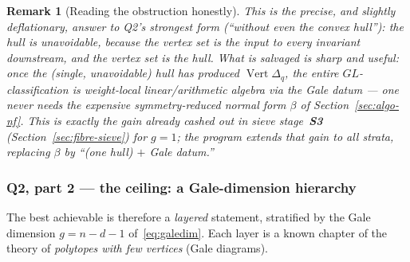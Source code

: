 \documentclass{amsart}
\newtheorem{remark}[theorem]{Remark}
\begin{document}
\begin{remark}[Reading the obstruction honestly]\label{rmk:obstruction}
This is the precise, and slightly deflationary, answer to Q2's strongest form
(``without even the convex hull''): \emph{the hull is unavoidable, because the
vertex set is the input to every invariant downstream, and the vertex set is the
hull.} What \emph{is} salvaged is sharp and useful: once the (single, unavoidable)
hull has produced $\operatorname{Vert}\Delta_q$, the entire $GL$-classification
is weight-local linear/arithmetic algebra via the Gale datum --- one never needs
the expensive symmetry-reduced normal form $\beta$ of Section~\ref{sec:algo-nf}.
This is exactly the gain already cashed out in sieve stage~\textbf{S3}
(Section~\ref{sec:fibre-sieve}) for $g=1$; the program extends that gain to all
strata, replacing $\beta$ by ``(one hull) $+$ Gale datum.''
\end{remark}

\subsubsection*{Q2, part 2 --- the ceiling: a Gale-dimension hierarchy}

The best achievable is therefore a \emph{layered} statement, stratified by the
Gale dimension $g=n-d-1$ of~\eqref{eq:galedim}. Each layer is a known chapter of
the theory of \emph{polytopes with few vertices} (Gale diagrams).
\end{document}
